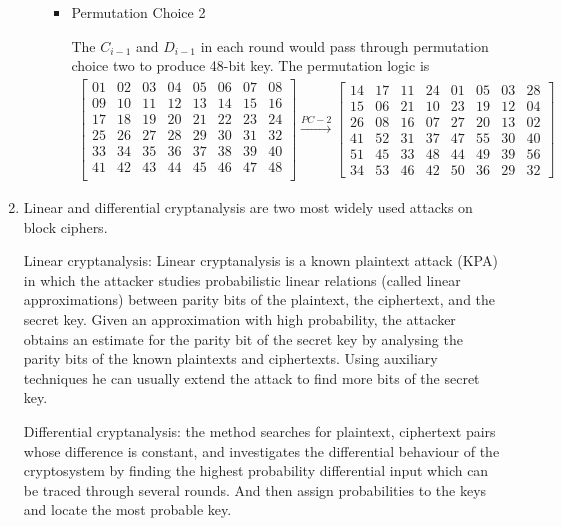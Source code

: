 \documentclass[11pt,a4paper]{article}
\begin{document}
\begin{enumerate}
\begin{itemize}
\begin{itemize}
			\item Permutation Choice 2
			\par The $C_{i-1}$ and $D_{i-1}$ in each round would pass through permutation choice two to produce 48-bit key. The permutation logic is
			\begin{align*}
				\begin{bmatrix}
					01 & 02 & 03 & 04 & 05 & 06 & 07 & 08 \\
					09 & 10 & 11 & 12 & 13 & 14 & 15 & 16 \\
					17 & 18 & 19 & 20 & 21 & 22 & 23 & 24 \\
					25 & 26 & 27 & 28 & 29 & 30 & 31 & 32 \\
					33 & 34 & 35 & 36 & 37 & 38 & 39 & 40 \\
					41 & 42 & 43 & 44 & 45 & 46 & 47 & 48 \\
				\end{bmatrix}
				\xrightarrow{PC-2}
				\begin{bmatrix}
					14 & 17 & 11 & 24 & 01 & 05 & 03 & 28 \\
					15 & 06 & 21 & 10 & 23 & 19 & 12 & 04 \\
					26 & 08 & 16 & 07 & 27 & 20 & 13 & 02 \\
					41 & 52 & 31 & 37 & 47 & 55 & 30 & 40 \\
					51 & 45 & 33 & 48 & 44 & 49 & 39 & 56 \\
					34 & 53 & 46 & 42 & 50 & 36 & 29 & 32
				\end{bmatrix}
			\end{align*}
		\end{itemize}
	\end{itemize}
	
	\item Linear and differential cryptanalysis are two most widely used attacks on block ciphers.
	\par Linear cryptanalysis: Linear cryptanalysis is a known plaintext attack (KPA) in which the attacker studies probabilistic linear relations (called linear approximations) between parity bits of the plaintext, the ciphertext, and the secret key. Given an approximation with high probability, the attacker obtains an estimate for the parity bit of the secret key by analysing the parity bits of the known plaintexts and ciphertexts. Using auxiliary techniques he can usually extend the attack to find more bits of the secret key.
	\par Differential cryptanalysis: the method searches for plaintext, ciphertext pairs whose difference is constant, and investigates the differential behaviour of the cryptosystem by finding the highest probability differential input which can be traced through several rounds. And then assign probabilities to the keys and locate the most probable key.
	

\end{enumerate}
\end{document}
